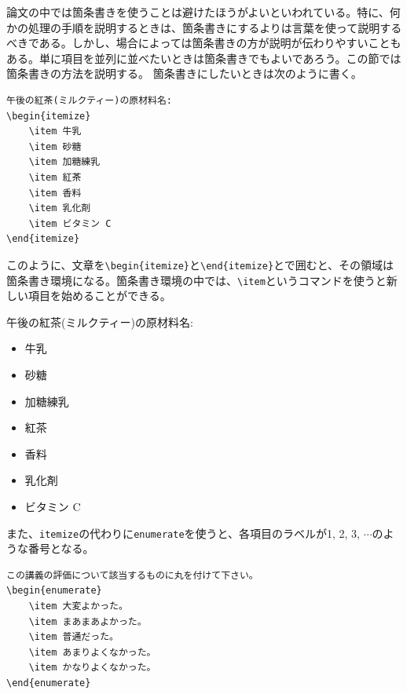 論文の中では箇条書きを使うことは避けたほうがよいといわれている。特に、何かの処理の手順を説明するときは、箇条書きにするよりは言葉を使って説明するべきである。しかし、場合によっては箇条書きの方が説明が伝わりやすいこともある。単に項目を並列に並べたいときは箇条書きでもよいであろう。この節では箇条書きの方法を説明する。
箇条書きにしたいときは次のように書く。
\begin{reidai}
    \begin{verbatim}
午後の紅茶(ミルクティー)の原材料名:
\begin{itemize}
    \item 牛乳
    \item 砂糖
    \item 加糖練乳
    \item 紅茶
    \item 香料
    \item 乳化剤
    \item ビタミン C
\end{itemize}
\end{verbatim}
\end{reidai} \noindent
このように、文章を\verb|\begin{itemize}|と\verb|\end{itemize}|とで囲むと、その領域は箇条書き環境になる。箇条書き環境の中では、\verb|\item|というコマンドを使うと新しい項目を始めることができる。
\begin{kekka}
    \def\labelitemisave{\labelitemi}
    \def\labelitemi{\(\bullet\)}
    午後の紅茶(ミルクティー)の原材料名:
    \begin{itemize}
        \item 牛乳
        \item 砂糖
        \item 加糖練乳
        \item 紅茶
        \item 香料
        \item 乳化剤
        \item ビタミン C
    \end{itemize}
    \def\labelitemi{\labelitemisave}
\end{kekka} \noindent
また、\texttt{itemize}の代わりに\texttt{enumerate}を使うと、各項目のラベルが1, 2, 3, \(\cdots\)のような番号となる。
\begin{reidai}
    \begin{verbatim}
この講義の評価について該当するものに丸を付けて下さい。
\begin{enumerate}
    \item 大変よかった。
    \item まあまあよかった。
    \item 普通だった。
    \item あまりよくなかった。
    \item かなりよくなかった。
\end{enumerate}
\end{verbatim}
\end{reidai}
